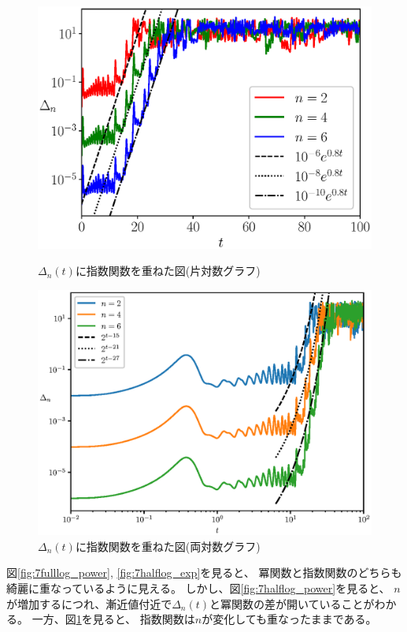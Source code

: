 \documentclass[a4j, titlepage]{jsarticle}
\numberwithin{equation}{section}
\begin{document}
            \begin{figure}[h]
                \begin{minipage}{0.49\hsize}
                    \centering
                    \includegraphics[width=1\hsize]{kadai7/2halflog_exp.eps}
                    \caption{
                        $\Delta_n(t)$に指数関数を重ねた図(片対数グラフ)
                    }
                    \label{fig:7halflog_exp}
                \end{minipage}
                \begin{minipage}{0.49\hsize}
                    \centering
                    \includegraphics[width=1\hsize]{kadai7/2fulllog_exp.eps}
                    \caption{
                        $\Delta_n(t)$に指数関数を重ねた図(両対数グラフ)
                    }
                    \label{fig:7fulllog_exp}
                \end{minipage}
            \end{figure}
            図\ref{fig:7fulllog_power}, \ref{fig:7halflog_exp}を見ると、
            冪関数と指数関数のどちらも綺麗に重なっているように見える。
            しかし、図\ref{fig:7halflog_power}を見ると、
            $n$が増加するにつれ、漸近値付近で$\Delta_n(t)$と冪関数の差が開いていることがわかる。
            一方、図\ref{fig:7fulllog_exp}を見ると、
            指数関数は$n$が変化しても重なったままである。
\end{document}
